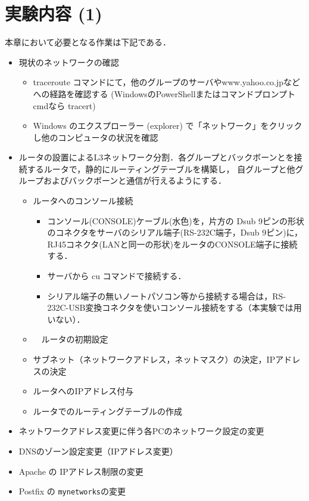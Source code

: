 \section{実験内容 (1)}
本章において必要となる作業は下記である．

\begin{itemize}
\item 現状のネットワークの確認
  \begin{itemize}
      \item traceroute コマンドにて，他のグループのサーバやwww.yahoo.co.jpなどへの経路を確認する (WindowsのPowerShellまたはコマンドプロンプトcmdなら tracert)
      \item Windows のエクスプローラー (explorer) で「ネットワーク」をクリックし他のコンピュータの状況を確認
  \end{itemize}
\item ルータの設置によるL3ネットワーク分割．各グループとバックボーンとを接続するルータで，静的にルーティングテーブルを構築し，
自グループと他グループおよびバックボーンと通信が行えるようにする．
  \begin{itemize}
    \item ルータへのコンソール接続
      \begin{itemize}
        \item コンソール(CONSOLE)ケーブル(水色)を，片方の Dsub 9ピンの形状のコネクタをサーバのシリアル端子(RS-232C端子，Dsub 9ピン)に，RJ45コネクタ(LANと同一の形状)をルータのCONSOLE端子に接続する．
        \item サーバから cu コマンドで接続する．
        \item シリアル端子の無いノートパソコン等から接続する場合は，RS-232C-USB変換コネクタを使いコンソール接続をする（本実験では用いない）．
      \end{itemize}
    \item　ルータの初期設定
    \item サブネット（ネットワークアドレス，ネットマスク）の決定，IPアドレスの決定
    \item ルータへのIPアドレス付与
    \item ルータでのルーティングテーブルの作成
  \end{itemize}
\item ネットワークアドレス変更に伴う各PCのネットワーク設定の変更
\item DNSのゾーン設定変更（IPアドレス変更）
\item Apache の IPアドレス制限の変更
\item Postfix の \texttt{mynetworks}の変更
\end{itemize}

